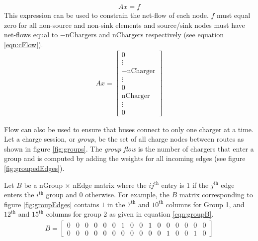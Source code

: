 \begin{align}
	Ax = f
\end{align}
This expression can be used to constrain the net-flow of each node.  $f$ must equal zero for all non-source and non-sink elements and source/sink nodes must have net-flows equal to $-\text{nChargers}$ and nChargers respectively (see equation \ref{eqn:cFlow}).
\begin{align}\label{eqn:cFlow}
	Ax = \begin{bmatrix} 0 \\ \vdots \\ -\text{nCharger} \\ \vdots \\ 0 \\ \text{nCharger} \\ \vdots \\ 0\end{bmatrix}
\end{align}

\par Flow can also be used to ensure that buses connect to only one charger at a time. Let a charge session, or \textit{group}, be the set of all charge nodes between routes as shown in figure \ref{fig:groups}. The \textit{group flow} is the number of chargers that enter a group and is computed by adding the weights for all incoming edges (see figure \ref{fig:groupedEdges}). 
\par Let $B$ be a nGroup $\times$ nEdge matrix where the $ij^{\text{th}}$ entry is $1$ if the $j^{\text{th}}$ edge enters the $i^{\text{th}}$ group and $0$ otherwise. For example, the $B$ matrix corresponding to figure \ref{fig:groupEdges} contains $1$ in the $7^{\text{th}}$ and $10^{\text{th}}$ columns for Group 1, and $12^{\text{th}}$ and $15^{\text{th}}$ columns for group 2 as given in equation \ref{eqn:groupB}.
\begin{align}\label{eqn:groupB}
	B = \begin{bmatrix}0 & 0 & 0 & 0 & 0 & 0 & 1 & 0 & 0 & 1 & 0 & 0 & 0 & 0 & 0 & 0\\
	                   0 & 0 & 0 & 0 & 0 & 0 & 0 & 0 & 0 & 0 & 0 & 1 & 0 & 0 & 1 & 0\end{bmatrix}
\end{align}

